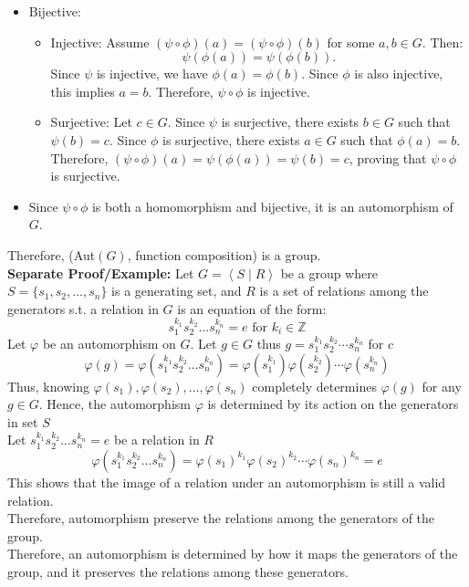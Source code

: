 \documentclass[12pt, letterpaper]{article}
\theoremstyle{definition}
\newcommand{\Z}{\mathbb{Z}}
\newcommand{\ang}[1]{\left\langle #1 \right\rangle}
\begin{document}
\begin{enumerate}
\begin{itemize}
        \item Bijective:
        \begin{itemize}
            \item Injective: Assume \( (\psi \circ \phi)(a) = (\psi \circ \phi)(b) \) for some \( a, b \in G \). Then:
            \[
            \psi(\phi(a)) = \psi(\phi(b)).
            \]
            Since \( \psi \) is injective, we have \( \phi(a) = \phi(b) \). Since \( \phi \) is also injective, this implies \( a = b \). Therefore, \( \psi \circ \phi \) is injective.
            
            \item Surjective: Let \( c \in G \). Since \( \psi \) is surjective, there exists \( b \in G \) such that \( \psi(b) = c \). Since \( \phi \) is surjective, there exists \( a \in G \) such that \( \phi(a) = b \). Therefore, \( (\psi \circ \phi)(a) = \psi(\phi(a)) = \psi(b) = c \), proving that \( \psi \circ \phi \) is surjective.
        \end{itemize}
    
        \item Since \( \psi \circ \phi \) is both a homomorphism and bijective, it is an automorphism of \( G \).
    \end{itemize}
\end{enumerate}
Therefore, (Aut$(G)$, function composition) is a group.\\
\textbf{Separate Proof/Example:} Let $G = \ang{S \mid R}$ be a group where $S=\{s_1,s_2,\dots,s_n\}$ is a generating set, and $R$ is a set of relations among the generators s.t. a relation in $G$ is an equation of the form:
\[
s_1^{k_1}s_2^{k_2}\dots s_n^{k_n}=e  \text{ for $k_i \in \Z$}
\]
Let $\varphi$ be an automorphism on $G$. Let $g \in G$ thus $g=s_1^{k_1}s_2^{k_2}\cdots s_n^{k_n}$ for $c$
\[
\varphi(g)=\varphi(s_1^{k_1}s_2^{k_2}\dots s_n^{k_n})=\varphi(s_1^{k_1})\varphi(s_2^{k_2})\cdots \varphi(s_n^{k_n})
\]
Thus, knowing $\varphi(s_1),\varphi(s_2),\dots ,\varphi(s_n)$ completely determines $\varphi(g)$ for any $g \in G$. Hence, the automorphism $\varphi$ is determined by its action on the generators in set $S$\\
Let $s_1^{k_1}s_2^{k_2}\dots s_n^{k_n}=e$ be a relation in $R$\\
\[
\varphi(s_1^{k_1}s_2^{k_2}\dots s_n^{k_n})=\varphi(s_1)^{k_1}\varphi(s_2)^{k_2}\cdots \varphi(s_n)^{k_n}=e
\]
This shows that the image of a relation under an automorphism is still a valid relation.\\
Therefore, automorphism preserve the relations among the generators of the group.\\
Therefore, an automorphism is determined by how it maps the generators of the group, and it preserves the relations among these generators.
\end{document}
